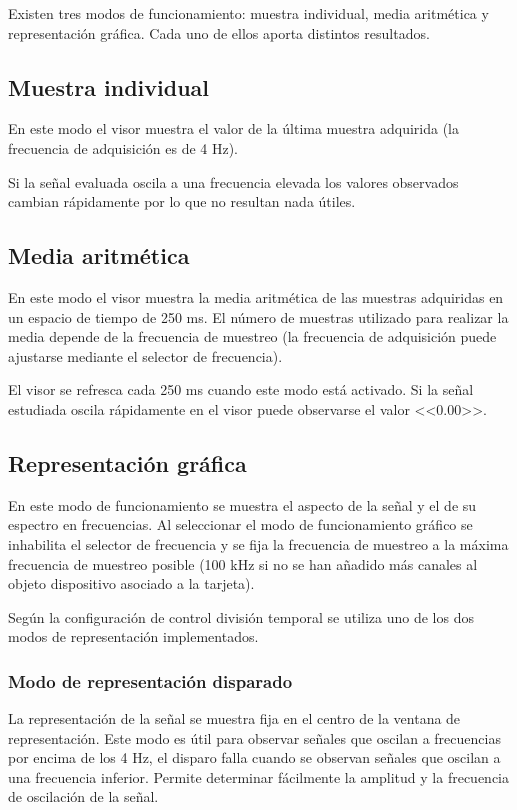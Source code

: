 Existen tres modos de funcionamiento: muestra individual, media aritmética
y representación gráfica. Cada uno de ellos aporta distintos resultados.


\subsection{Muestra individual}

En este modo el visor muestra el valor de la última muestra adquirida (la
frecuencia de adquisición es de 4 Hz).

Si la señal evaluada oscila a una frecuencia elevada los valores observados
cambian rápidamente por lo que no resultan nada útiles.


\subsection{Media aritmética}

En este modo el visor muestra la media aritmética de las muestras
adquiridas en un espacio de tiempo de 250 ms. El número de muestras
utilizado para realizar la media depende de la frecuencia de muestreo (la
frecuencia de adquisición puede ajustarse mediante el selector de
frecuencia).

El visor se refresca cada 250 ms cuando este modo está activado. Si la
señal estudiada oscila rápidamente en el visor puede observarse el valor
<<$0.00$>>.


\subsection{Representación gráfica}

En este modo de funcionamiento se muestra el aspecto de la señal y el de su
espectro en frecuencias. Al seleccionar el modo de funcionamiento gráfico
se inhabilita el selector de frecuencia y se fija la frecuencia de muestreo
a la máxima frecuencia de muestreo posible (100 kHz si no se han añadido
más canales al objeto dispositivo asociado a la tarjeta).

Según la configuración de control división temporal se utiliza uno de los
dos modos de representación implementados.


\subsubsection{Modo de representación disparado}

La representación de la señal se muestra fija en el centro de la ventana de
representación. Este modo es útil para observar señales que oscilan a
frecuencias por encima de los 4 Hz, el disparo falla cuando se observan
señales que oscilan a una frecuencia inferior. Permite determinar
fácilmente la amplitud y la frecuencia de oscilación de la señal.


